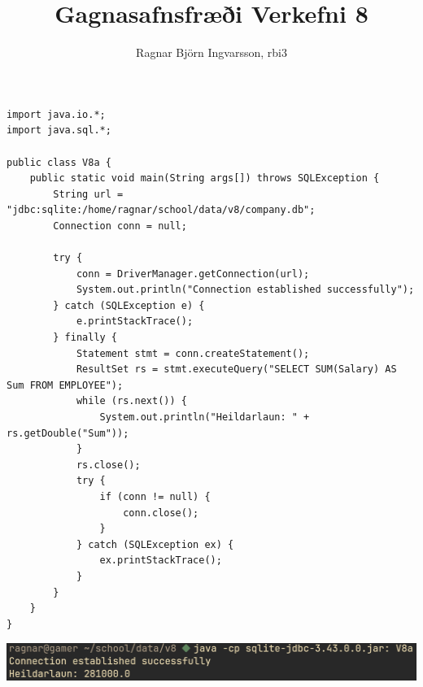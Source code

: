 \documentclass{article}
\title{Gagnasafnsfræði Verkefni 8}
\author{Ragnar Björn Ingvarsson, rbi3}
\begin{document}
\renewcommand\thepage{}
	
	\maketitle

	\newpage
	\setcounter{page}{1}
	\renewcommand\thepage{\arabic{page}}

	\section{}
	\begin{verbatim}
import java.io.*;
import java.sql.*;

public class V8a {
	public static void main(String args[]) throws SQLException {
		String url = "jdbc:sqlite:/home/ragnar/school/data/v8/company.db";
		Connection conn = null;

		try {
			conn = DriverManager.getConnection(url);
			System.out.println("Connection established successfully");
		} catch (SQLException e) {
			e.printStackTrace();
		} finally {
			Statement stmt = conn.createStatement();
			ResultSet rs = stmt.executeQuery("SELECT SUM(Salary) AS Sum FROM EMPLOYEE");
			while (rs.next()) {
				System.out.println("Heildarlaun: " + rs.getDouble("Sum"));
			}
			rs.close();
			try {
				if (conn != null) {
					conn.close();
				}
			} catch (SQLException ex) {
				ex.printStackTrace();
			}
		}
	}
}
	\end{verbatim}
	\begin{center}
		\includegraphics[scale=0.35]{a.png}
	\end{center}

	\newpage
\end{document}
